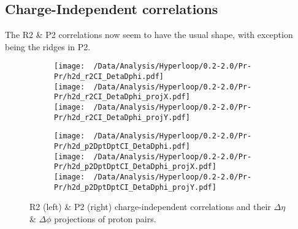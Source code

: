 \documentclass[12pt,a4paper,twoside]{report}
\begin{document}
\subsection{Charge-Independent correlations}
The R2 \& P2 correlations now seem to have the usual shape, with exception being the ridges in P2.
\begin{figure}[H]
	\begin{subfigure}{0.49\linewidth}
		\texttt{[image: ~/Data/Analysis/Hyperloop/0.2-2.0/Pr-Pr/h2d\_r2CI\_DetaDphi.pdf]}\\
		\texttt{[image: ~/Data/Analysis/Hyperloop/0.2-2.0/Pr-Pr/h2d\_r2CI\_DetaDphi\_projX.pdf]}\\
		\texttt{[image: ~/Data/Analysis/Hyperloop/0.2-2.0/Pr-Pr/h2d\_r2CI\_DetaDphi\_projY.pdf]}\\
	\end{subfigure}
	\begin{subfigure}{0.49\linewidth}
		\texttt{[image: ~/Data/Analysis/Hyperloop/0.2-2.0/Pr-Pr/h2d\_p2DptDptCI\_DetaDphi.pdf]}\\
		\texttt{[image: ~/Data/Analysis/Hyperloop/0.2-2.0/Pr-Pr/h2d\_p2DptDptCI\_DetaDphi\_projX.pdf]}\\
		\texttt{[image: ~/Data/Analysis/Hyperloop/0.2-2.0/Pr-Pr/h2d\_p2DptDptCI\_DetaDphi\_projY.pdf]}\\
	\end{subfigure}
	\caption{R2 (left) \& P2 (right) charge-independent correlations and their $\Delta\eta$ \& $\Delta\phi$ projections of proton pairs.}
\end{figure}
\end{document}
